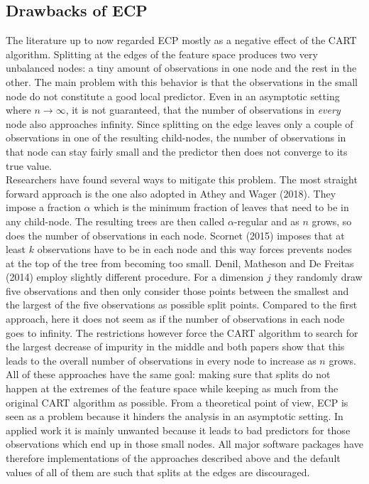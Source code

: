 \documentclass{article}
\begin{document}
\subsection{Drawbacks of ECP}
The literature up to now regarded ECP mostly as a negative effect of the CART algorithm. Splitting at the edges of the feature space produces two very unbalanced nodes: a tiny amount of observations in one node and the rest in the other. The main problem with this behavior is that the observations in the small node do not constitute a good local predictor. Even in an asymptotic setting where $n \rightarrow \infty$, it is not guaranteed, that the number of observations in \textit{every} node also approaches infinity. Since splitting on the edge leaves only a couple of observations in one of the resulting child-nodes, the number of observations in that node can stay fairly small and the predictor then does not converge to its true value. \\
Researchers have found several ways to mitigate this problem. The most straight forward approach is the one also adopted in Athey and Wager (2018). They impose a fraction $\alpha$ which is the minimum fraction of leaves that need to be in any child-node. The resulting trees are then called $\alpha$-regular and as $n$ grows, so does the number of observations in each node. Scornet (2015) imposes that at least $k$ observations have to be in each node and this way forces prevents nodes at the top of the tree from becoming too small. Denil, Matheson and De Freitas (2014) employ slightly different procedure. For a dimension $j$ they randomly draw five observations and then only consider those points between the smallest and the largest of the five observations as possible split points. Compared to the first approach, here it does not seem as if the number of observations in each node goes to infinity. The restrictions however force the CART algorithm to search for the largest decrease of impurity in the middle and both papers show that this leads to the overall number of observations in every node to increase as $n$ grows. \\
All of these approaches have the same goal: making sure that splits do not happen at the extremes of the feature space while keeping as much from the original CART algorithm as possible. From a theoretical point of view, ECP is seen as a problem because it hinders the analysis in an asymptotic setting. In applied work it is mainly unwanted because it leads to bad predictors for those observations which end up in those small nodes. All major software packages have therefore implementations of the approaches described above and the default values of all of them are such that splits at the edges are discouraged.
\end{document}
